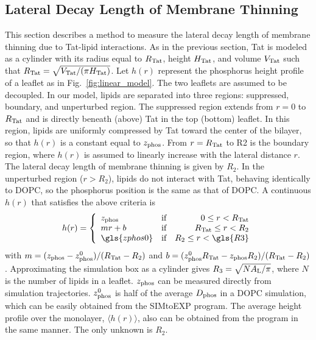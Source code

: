 \subsection{Lateral Decay Length of Membrane Thinning}\label{sec:lateral_decay}
This section describes a method to measure the lateral decay length
of membrane thinning due to Tat-lipid interactions. 
As in the previous section, Tat is modeled as a cylinder with 
its radius equal to $R_\textrm{Tat}$, height $H_\textrm{Tat}$,
and volume $V_\textrm{Tat}$ such that $R_\textrm{Tat}=\sqrt{V_\textrm{Tat}/(\pi H_\textrm{Tat})}$. 
Let $h(r)$ represent the phosphorus height profile
of a leaflet as in Fig.~\ref{fig:linear_model}. The two leaflets are assumed to be decoupled.
In our model, lipids are separated into three regions: 
suppressed, boundary, and unperturbed region. 
The suppressed region extends from $r=0$ to $R_\textrm{Tat}$ and is directly beneath 
(above) Tat in the top (bottom) leaflet. In this region, lipids are uniformly 
compressed by Tat toward the 
center of the bilayer, so that $h(r)$ is a constant equal to $z_\textrm{phos}$. 
From $r=R_\textrm{Tat}$ to \gls{R2} is the boundary region, where $h(r)$ is assumed to 
linearly increase with the lateral distance $r$. The lateral decay length
of membrane thinning is given by $R_2$. 
In the unperturbed region ($r>R_2$), lipids do not interact with 
Tat, behaving identically to DOPC, so the phosphorus position is the same as that of 
DOPC. A continuous $h(r)$ that 
satisfies the above criteria is
\begin{equation}
  h(r) = \left\{ 
  \begin{array}{lcr}
    \zphos       & \text{if} & 0     \leq r < \RTat \\
    mr+b         & \text{if} & \RTat \leq r < R_2 \\
    \gls{zphos0} & \text{if} & R_2   \leq r < \gls{R3} 
  \end{array}\right.  
\end{equation}     
with $m=(z_\textrm{phos}-z_\textrm{phos}^0)/(R_\textrm{Tat}-R_2)$ and $b=(z_\textrm{phos}^0R_\textrm{Tat}-z_\textrm{phos} R_2)/(R_\textrm{Tat}-R_2)$. 
Approximating the simulation box as a cylinder gives 
$R_3=\sqrt{NA_\textrm{L}/\pi}$, where $N$ is the number of lipids in a leaflet. 
$z_\textrm{phos}$ can be measured directly from simulation trajectories.
$z_\textrm{phos}^0$ is half of the average $D_\text{phos}$ in a DOPC simulation,
which can be easily obtained from the SIMtoEXP program. 
The average height profile over
the monolayer, $\langle h(r) \rangle$, also can be obtained from the program 
in the same manner. 
The only unknown is $R_2$.

